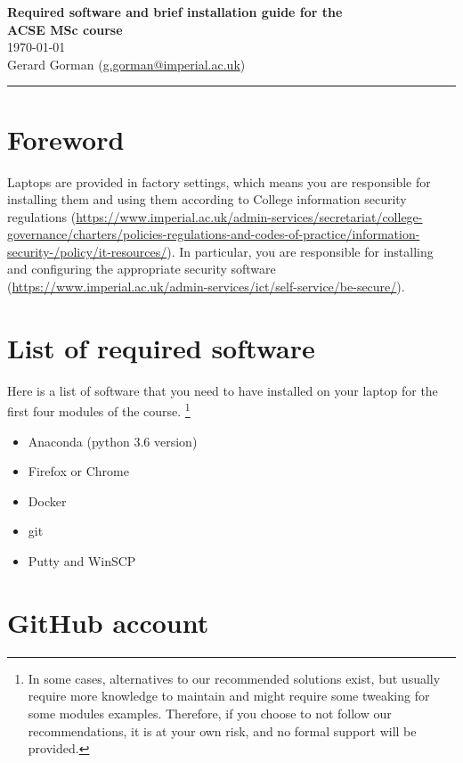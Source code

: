 \documentclass[11pt]{article}
\begin{document}
\begin{center}
{\bf \Large Required software and brief installation guide for the \\ ACSE MSc course } \\ 
\today \\
Gerard Gorman (\href{mailto:g.gorman@imperial.ac.uk}{g.gorman@imperial.ac.uk})
\end{center}
\hrule
\vspace*{1cm}


\section{Foreword}

Laptops are provided in factory settings, which means you are responsible for installing them and using them according to College information security regulations (\url{https://www.imperial.ac.uk/admin-services/secretariat/college-governance/charters/policies-regulations-and-codes-of-practice/information-security-/policy/it-resources/}). 
In particular, you are responsible for installing and configuring the appropriate security software (\url{https://www.imperial.ac.uk/admin-services/ict/self-service/be-secure/}).


\section{List of required software}

Here is a list of  software that you need to have installed on your laptop for the first four modules of the course.
\footnote{In some cases, alternatives to our recommended solutions exist, but usually require more knowledge to maintain and might require some tweaking for some modules examples. 
Therefore, if you choose to not follow our recommendations, it is at your own risk, and no formal support will be provided.}

\begin{itemize}
  \item Anaconda (python 3.6 version)
  \item Firefox or Chrome
  \item Docker
  \item git
  \item Putty and WinSCP
\end{itemize}


\section{GitHub account}
\end{document}

